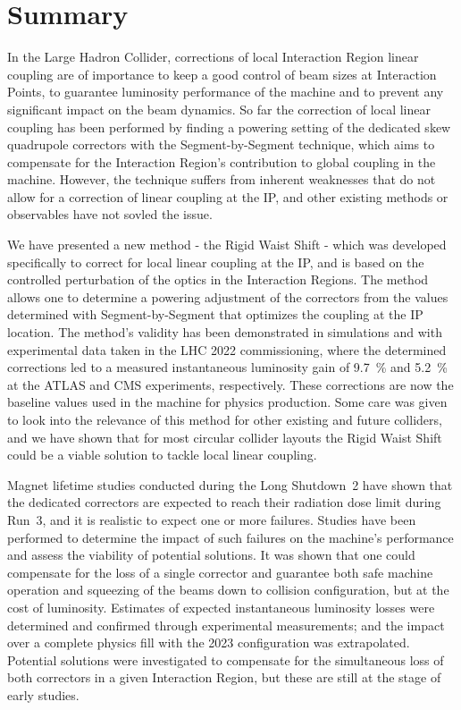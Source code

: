 

\section{Summary}

In the Large Hadron Collider, corrections of local Interaction Region linear coupling are of importance to keep a good control of beam sizes at Interaction Points, to guarantee luminosity performance of the machine and to prevent any significant impact on the beam dynamics.
So far the correction of local linear coupling has been performed by finding a powering setting of the dedicated skew quadrupole correctors with the Segment-by-Segment technique, which aims to compensate for the Interaction Region's contribution to global coupling in the machine.
However, the technique suffers from inherent weaknesses that do not allow for a correction of linear coupling at the IP, and other existing methods or observables have not sovled the issue.
\newline

We have presented a new method - the Rigid Waist Shift - which was developed specifically to correct for local linear coupling at the IP, and is based on the controlled perturbation of the optics in the Interaction Regions.
The method allows one to determine a powering adjustment of the correctors from the values determined with Segment-by-Segment that optimizes the coupling at the IP location.
The method's validity has been demonstrated in simulations and with experimental data taken in the LHC \num{2022} commissioning, where the determined corrections led to a measured instantaneous luminosity gain of \qty{9.7}{\percent} and \qty{5.2}{\percent} at the ATLAS and CMS experiments, respectively.
These corrections are now the baseline values used in the machine for physics production.
Some care was given to look into the relevance of this method for other existing and future colliders, and we have shown that for most circular collider layouts the Rigid Waist Shift could be a viable solution to tackle local linear coupling.
\newline

Magnet lifetime studies conducted during the Long Shutdown~\num{2} have shown that the dedicated correctors are expected to reach their radiation dose limit during Run~\num{3}, and it is realistic to expect one or more failures.
Studies have been performed to determine the impact of such failures on the machine's performance and assess the viability of potential solutions.
It was shown that one could compensate for the loss of a single corrector and guarantee both safe machine operation and squeezing of the beams down to collision configuration, but at the cost of luminosity.
Estimates of expected instantaneous luminosity losses were determined and confirmed through experimental measurements; and the impact over a complete physics fill with the \num{2023} configuration was extrapolated.
Potential solutions were investigated to compensate for the simultaneous loss of both correctors in a given Interaction Region, but these are still at the stage of early studies.
